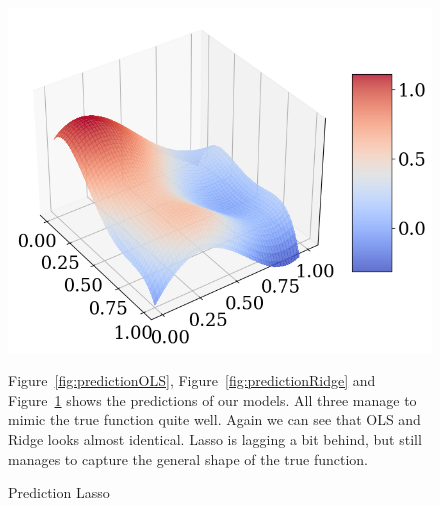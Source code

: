 \documentclass[twoside,11pt]{report}
\begin{document}
\begin{figure}[h]
\begin{minipage}[t]{.48\linewidth}
    \begin{center}
        \includegraphics[width=1.0\textwidth]{../runsAndAdditions/predictionLasso.png}
        \caption{Prediction Lasso}\label{fig:predictionLasso}
\end{center}
\end{minipage}
\hspace{4mm}
\begin{minipage}[t]{.48\linewidth}
    Figure~\ref{fig:predictionOLS}, Figure~\ref{fig:predictionRidge} and Figure~\ref{fig:predictionLasso} shows the 
    predictions of our models. All three manage to mimic the true function quite well. Again we can see that OLS and Ridge
    looks almost identical. Lasso is lagging a bit behind, but still manages to capture the general shape of the true function.
\end{minipage}
\end{figure}
\end{document}
